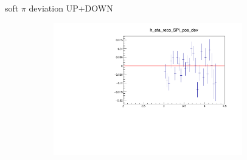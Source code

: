 \documentclass[11pt]{beamer}
\begin{document}
\begin{frame}{soft $\pi$ deviation UP+DOWN}
\begin{figure}
\begin{subfigure}{0.45\textwidth}
\end{subfigure}
\begin{subfigure}{0.45\textwidth}
\includegraphics[width=0.9\textwidth]{sec/up_plus_down_pdf/eta_2.pdf}
\end{subfigure}
\end{figure}
\end{frame}
\end{document}
